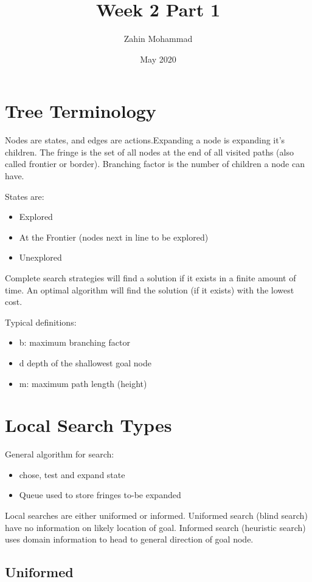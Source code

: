 \documentclass{article}
\title{Week 2 Part 1}
\author{Zahin Mohammad}
\date{May 2020}
\begin{document}
\maketitle
\section{Tree Terminology}
    Nodes are states, and edges are actions.Expanding a node is expanding it's children. The fringe is the set of all nodes at the end of all visited paths (also called frontier or border). Branching factor is the number of children a node can have.
    
    States are:
    \begin{itemize}
        \item Explored
        \item At the Frontier (nodes next in line to be explored)
        \item Unexplored
    \end{itemize}
    
    Complete search strategies will find a solution if it exists in a finite amount of time. An optimal algorithm will find the solution (if it exists) with the lowest cost.

    Typical definitions:
    \begin{itemize}
        \item b: maximum branching factor
        \item d depth of the shallowest goal node
        \item m: maximum path length (height)
    \end{itemize}

\section{Local Search Types}
    
    General algorithm for search:
    \begin{itemize}
        \item chose, test and expand state
        \item Queue used to store fringes to-be expanded
    \end{itemize}

    Local searches are either uniformed or informed. Uniformed search (blind search) have no information on likely location of goal. Informed search (heuristic search) uses domain information to head to general direction of goal node.
\subsection{Uniformed}
\end{document}
